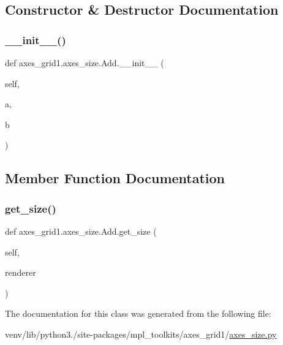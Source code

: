 \subsection{Constructor \& Destructor Documentation}
\mbox{\label{classaxes__grid1_1_1axes__size_1_1Add_a3f4068c7f5a066b003c50ded550dc4a0}} 
\subsubsection{\texorpdfstring{\+\_\+\+\_\+init\+\_\+\+\_\+()}{\_\_init\_\_()}}
{\footnotesize\ttfamily def axes\+\_\+grid1.\+axes\+\_\+size.\+Add.\+\_\+\+\_\+init\+\_\+\+\_\+ (\begin{DoxyParamCaption}\item[{}]{self,  }\item[{}]{a,  }\item[{}]{b }\end{DoxyParamCaption})}



\subsection{Member Function Documentation}
\mbox{\label{classaxes__grid1_1_1axes__size_1_1Add_a11bd792fd87459af2d5f126c7c22384b}} 
\subsubsection{\texorpdfstring{get\+\_\+size()}{get\_size()}}
{\footnotesize\ttfamily def axes\+\_\+grid1.\+axes\+\_\+size.\+Add.\+get\+\_\+size (\begin{DoxyParamCaption}\item[{}]{self,  }\item[{}]{renderer }\end{DoxyParamCaption})}



The documentation for this class was generated from the following file\+:\begin{DoxyCompactItemize}
\item 
venv/lib/python3./site-\/packages/mpl\+\_\+toolkits/axes\+\_\+grid1/\hyperlink{_2axes__size_8py}{axes\+\_\+size.\+py}\end{DoxyCompactItemize}
